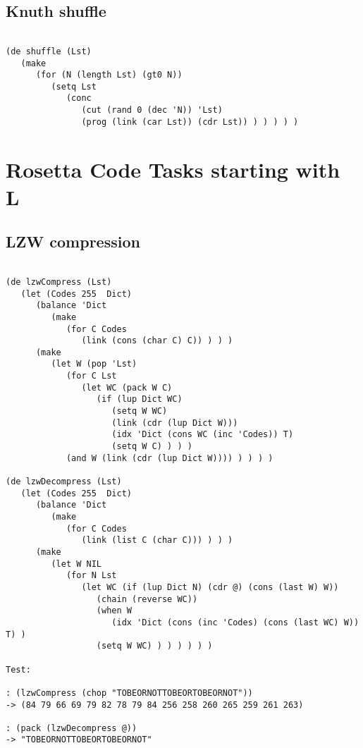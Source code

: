 \section*{Knuth shuffle}

\begin{verbatim}

(de shuffle (Lst)
   (make
      (for (N (length Lst) (gt0 N))
         (setq Lst
            (conc
               (cut (rand 0 (dec 'N)) 'Lst)
               (prog (link (car Lst)) (cdr Lst)) ) ) ) ) )

\end{verbatim}

\chapter{Rosetta Code Tasks starting with L}

\section*{LZW compression}

\begin{verbatim}

(de lzwCompress (Lst)
   (let (Codes 255  Dict)
      (balance 'Dict
         (make
            (for C Codes
               (link (cons (char C) C)) ) ) )
      (make
         (let W (pop 'Lst)
            (for C Lst
               (let WC (pack W C)
                  (if (lup Dict WC)
                     (setq W WC)
                     (link (cdr (lup Dict W)))
                     (idx 'Dict (cons WC (inc 'Codes)) T)
                     (setq W C) ) ) )
            (and W (link (cdr (lup Dict W)))) ) ) ) )

(de lzwDecompress (Lst)
   (let (Codes 255  Dict)
      (balance 'Dict
         (make
            (for C Codes
               (link (list C (char C))) ) ) )
      (make
         (let W NIL
            (for N Lst
               (let WC (if (lup Dict N) (cdr @) (cons (last W) W))
                  (chain (reverse WC))
                  (when W
                     (idx 'Dict (cons (inc 'Codes) (cons (last WC) W)) T) )
                  (setq W WC) ) ) ) ) ) )

Test:

: (lzwCompress (chop "TOBEORNOTTOBEORTOBEORNOT"))
-> (84 79 66 69 79 82 78 79 84 256 258 260 265 259 261 263)

: (pack (lzwDecompress @))
-> "TOBEORNOTTOBEORTOBEORNOT"

\end{verbatim}

